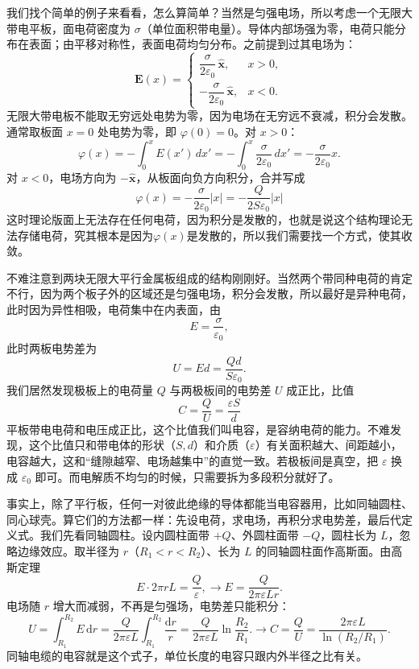 \documentclass[UTF8]{ctexbook}
\begin{document}
我们找个简单的例子来看看，怎么算简单？当然是匀强电场，所以考虑一个无限大带电平板，面电荷密度为 \(\sigma\)（单位面积带电量）。导体内部场强为零，电荷只能分布在表面；由平移对称性，表面电荷均匀分布。之前提到过其电场为：
\[
\mathbf{E}(x)=
\begin{cases}
\dfrac{\sigma}{2\varepsilon_0}\,\hat{\mathbf{x}}, & x>0,\\[6pt]
-\dfrac{\sigma}{2\varepsilon_0}\,\hat{\mathbf{x}}, & x<0.
\end{cases}
\]
无限大带电板不能取无穷远处电势为零，因为电场在无穷远不衰减，积分会发散。通常取板面 \(x=0\) 处电势为零，即 \(\varphi(0)=0\)。对 \(x>0\)：
\[
\varphi(x)=-\int_0^x E(x')\,dx'
=-\int_0^x \frac{\sigma}{2\varepsilon_0}\,dx'
=-\frac{\sigma}{2\varepsilon_0}x.
\]
对 \(x<0\)，电场方向为 \(-\hat{\mathbf{x}}\)，从板面向负方向积分，合并写成
\[
\varphi(x)=-\frac{\sigma}{2\varepsilon_0}|x|=-\frac{Q}{2S\varepsilon_0}|x|
\]
这时理论版面上无法存在任何电荷，因为积分是发散的，也就是说这个结构理论无法存储电荷，究其根本是因为$\varphi(x)$是发散的，所以我们需要找一个方式，使其收敛。

不难注意到两块无限大平行金属板组成的结构刚刚好。当然两个带同种电荷的肯定不行，因为两个板子外的区域还是匀强电场，积分会发散，所以最好是异种电荷，此时因为异性相吸，电荷集中在内表面，由
\[
E=\frac{\sigma}{\varepsilon_0},
\]
此时两板电势差为
\[
U=Ed=\frac{Q d}{S\varepsilon_0}.
\]
我们居然发现极板上的电荷量 \(Q\) 与两极板间的电势差 \(U\) 成正比，比值
\[
C=\frac{Q}{U}=\frac{\varepsilon S}{d}
\]
平板带电电荷和电压成正比，这个比值我们叫电容，是容纳电荷的能力。不难发现，这个比值只和带电体的形状（$S,d$）和介质（$\varepsilon$）有关面积越大、间距越小，电容越大，这和“缝隙越窄、电场越集中”的直觉一致。若极板间是真空，把 \(\varepsilon\) 换成 \(\varepsilon_0\) 即可。而电解质不均匀的时候，只需要拆为多段积分就好了。

事实上，除了平行板，任何一对彼此绝缘的导体都能当电容器用，比如同轴圆柱、同心球壳。算它们的方法都一样：先设电荷，求电场，再积分求电势差，最后代定义式。我们先看同轴圆柱。设内圆柱面带 \(+Q\)、外圆柱面带 \(-Q\)，圆柱长为 \(L\)，忽略边缘效应。取半径为 \(r\)（\(R_1<r<R_2\)）、长为 \(L\) 的同轴圆柱面作高斯面。由高斯定理
\[
E\cdot 2\pi rL=\frac{Q}{\varepsilon},
\longrightarrow
E=\frac{Q}{2\pi\varepsilon L r}.
\]
电场随 \(r\) 增大而减弱，不再是匀强场，电势差只能积分：
\[
U=\int_{R_1}^{R_2}E\,\mathrm{d}r
=\frac{Q}{2\pi\varepsilon L}\int_{R_1}^{R_2}\frac{\mathrm{d}r}{r}
=\frac{Q}{2\pi\varepsilon L}\ln\frac{R_2}{R_1}.
\longrightarrow
C=\frac{Q}{U}=\frac{2\pi\varepsilon L}{\ln(R_2/R_1)}.
\]
同轴电缆的电容就是这个式子，单位长度的电容只跟内外半径之比有关。
\end{document}
